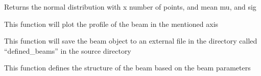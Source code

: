 \documentclass[letterpaper,10pt,english]{sphinxmanual}
\begin{document}
\begin{fulllineitems}
\begin{fulllineitems}
\end{fulllineitems}


\begin{fulllineitems}
\label{beam:beam.staticbeam.parabolic}
Returns the normal distribution with x number of points, and mean mu, and sig

\end{fulllineitems}


\begin{fulllineitems}
\label{beam:beam.staticbeam.plot}
This function will plot the profile of the beam in the mentioned axis

\end{fulllineitems}


\begin{fulllineitems}
\label{beam:beam.staticbeam.save}
This function will save the beam object to an external file in the directory called ``defined\_beams'' in the source directory

\end{fulllineitems}


\begin{fulllineitems}
\label{beam:beam.staticbeam.structure}
This function defines the structure of the beam based on the beam parameters

\end{fulllineitems}


\end{fulllineitems}
\end{document}
